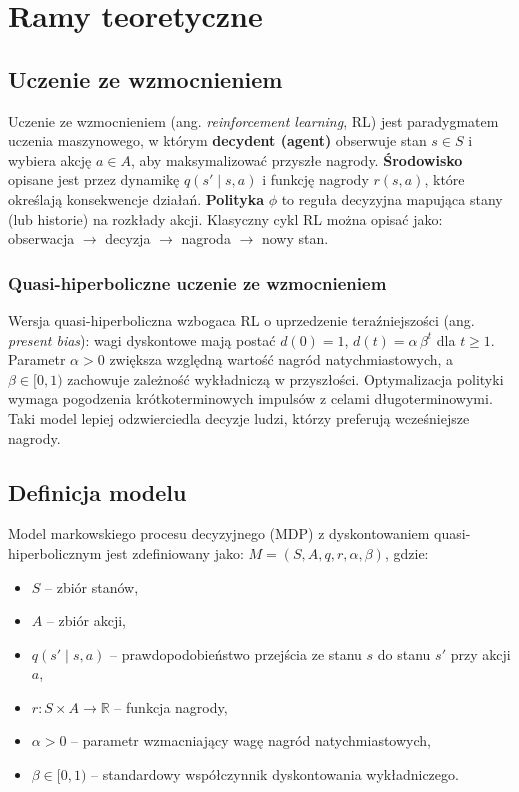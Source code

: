 \chapter{Ramy teoretyczne}

\section{Uczenie ze wzmocnieniem}

Uczenie ze wzmocnieniem (ang. \textit{reinforcement learning}, RL) jest paradygmatem uczenia maszynowego, w którym \textbf{decydent (agent)} obserwuje stan $s \in S$ i wybiera akcję $a \in A$, aby maksymalizować przyszłe nagrody. \textbf{Środowisko} opisane jest przez dynamikę $q(s' \mid s,a)$ i funkcję nagrody $r(s,a)$, które określają konsekwencje działań. \textbf{Polityka} $\phi$ to reguła decyzyjna mapująca stany (lub historie) na rozkłady akcji. Klasyczny cykl RL można opisać jako: obserwacja $\rightarrow$ decyzja $\rightarrow$ nagroda $\rightarrow$ nowy stan.

\subsection{Quasi-hiperboliczne uczenie ze wzmocnieniem}

Wersja quasi-hiperboliczna wzbogaca RL o uprzedzenie teraźniejszości (ang. \textit{present bias}): wagi dyskontowe mają postać $d(0)=1$, $d(t)=\alpha\,\beta^{t}$ dla $t \ge 1$. Parametr $\alpha > 0$ zwiększa względną wartość nagród natychmiastowych, a $\beta \in [0,1)$ zachowuje zależność wykładniczą w przyszłości. Optymalizacja polityki wymaga pogodzenia krótkoterminowych impulsów z celami długoterminowymi. Taki model lepiej odzwierciedla decyzje ludzi, którzy preferują wcześniejsze nagrody.

\section{Definicja modelu}

Model markowskiego procesu decyzyjnego (MDP) z dyskontowaniem quasi-hiperbolicznym jest zdefiniowany jako: $M = (S, A, q, r, \alpha, \beta)$, gdzie:

\begin{itemize}
\item $S$ -- zbiór stanów,
\item $A$ -- zbiór akcji,
\item $q(s' \mid s,a)$ -- prawdopodobieństwo przejścia ze stanu $s$ do stanu $s'$ przy akcji $a$,
\item $r : S \times A \rightarrow \mathbb{R}$ -- funkcja nagrody,
\item $\alpha > 0$ -- parametr wzmacniający wagę nagród natychmiastowych,
\item $\beta \in [0,1)$ -- standardowy współczynnik dyskontowania wykładniczego.
\end{itemize}

